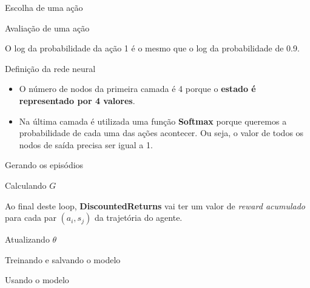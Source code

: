 \documentclass{beamer}
\begin{document}
\begin{frame}{Escolha de uma ação}
	
\end{frame}

\begin{frame}{Avaliação de uma ação}
	
	\vspace{1cm}
	O log da probabilidade da ação 1 é o mesmo que o log da probabilidade de 0.9. 
\end{frame}

\begin{frame}{Definição da rede neural}
	
	
	\begin{itemize}
		\item O número de nodos da primeira camada é 4 porque o \textbf{estado é representado por 4 valores}.
		\item Na última camada é utilizada uma função \textbf{Softmax} porque queremos a probabilidade de cada uma das ações acontecer. Ou seja, o valor de todos os nodos de saída precisa ser igual a 1. 
	\end{itemize}
	
	
\end{frame}

\begin{frame}{Gerando os episódios}
	\small
	
\end{frame}

\begin{frame}{Calculando $G$}
	
	\vspace{0.6cm}
	Ao final deste loop, \textbf{DiscountedReturns} vai ter um valor de \textit{reward acumulado} para cada par $(a_{i},s_{j})$ da trajetória do agente. 
\end{frame}

\begin{frame}{Atualizando $\theta$}
	\scriptsize
	
\end{frame}

\begin{frame}{Treinando e salvando o modelo}
	
\end{frame}

\begin{frame}{Usando o modelo}
	
\end{frame}
\end{document}
